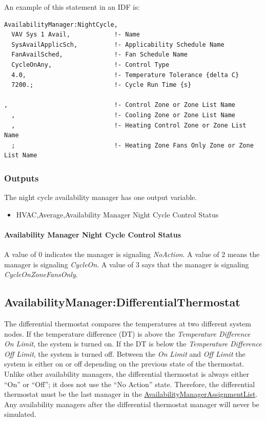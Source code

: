 An example of this statement in an IDF is:

\begin{lstlisting}
AvailabilityManager:NightCycle,
  VAV Sys 1 Avail,            !- Name
  SysAvailApplicSch,          !- Applicability Schedule Name
  FanAvailSched,              !- Fan Schedule Name
  CycleOnAny,                 !- Control Type
  4.0,                        !- Temperature Tolerance {delta C}
  7200.;                      !- Cycle Run Time {s}

,                             !- Control Zone or Zone List Name
  ,                           !- Cooling Zone or Zone List Name
  ,                           !- Heating Control Zone or Zone List Name
  ;                           !- Heating Zone Fans Only Zone or Zone List Name
\end{lstlisting}

\subsubsection{Outputs}\label{outputs-2-022}

The night cycle availability manager has one output variable.

\begin{itemize}
\tightlist
\item
  HVAC,Average,Availability Manager Night Cycle Control Status
\end{itemize}

\paragraph{Availability Manager Night Cycle Control Status}\label{availability-manager-night-cycle-control-status}

A value of 0 indicates the manager is signaling \emph{NoAction}. A value of 2 means the manager is signaling \emph{CycleOn}. A value of 3 says that the manager is signaling \emph{CycleOnZoneFansOnly}.

\subsection{AvailabilityManager:DifferentialThermostat}\label{availabilitymanagerdifferentialthermostat}

The differential thermostat compares the temperatures at two different system nodes. If the temperature difference (DT) is above the \emph{Temperature Difference On Limit}, the system is turned on. If the DT is below the \emph{Temperature Difference Off Limit}, the system is turned off. Between the \emph{On Limit} and \emph{Off Limit} the system is either on or off depending on the previous state of the thermostat. Unlike other availability managers, the differential thermostat is always either ``On'' or ``Off''; it does not use the ``No Action'' state. Therefore, the differential thermostat must be the last manager in the \hyperref[availabilitymanagerassignmentlist]{AvailabilityManagerAssignmentList}. Any availability managers after the differential thermostat manager will never be simulated.

